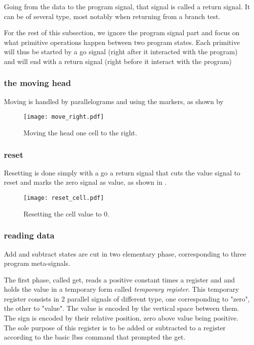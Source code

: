 Going from the data to the program signal, that signal is called a return signal.
It can be of several type, most notably when returning from a branch test.

For the rest of this subsection, we ignore the program signal part and focus on what primitive operations happen between two program states.
Each primitive will thus be started by a go signal (right after it interacted with the program) and will end with a return signal (right before it interact with the program)


\subsubsection{the moving head}
Moving is handled by parallelograms and using the markers, as shown by 

\begin{figure}[hbt]
	\centering
	\small%
	\texttt{[image: move\_right.pdf]}%
	\caption{Moving the head one cell to the right.}
	\label{fig:move:right}
\end{figure}


\subsubsection{reset}
Resetting is done simply with a go a return signal that cuts the value signal to reset and marks the zero signal as value, as shown in .
\begin{figure}[hbt]
	\centering
	\small%
	\texttt{[image: reset\_cell.pdf]}%
	\caption{Resetting the cell value to 0.}
	\label{fig:reset}
\end{figure}

\subsubsection{reading data}
Add and subtract states are cut in two elementary phase, corresponding to three program meta-signals.

The first phase, called get, reads a positive constant times a register and and holds the value in a temporary form called \emph{temporary register}. This temporary register consists in 2 parallel signals of different type, one corresponding to "zero", the other to "value". The value is encoded by the vertical space between them. The sign is encoded by their relative position, zero above value being positive. The sole purpose of this register is to be added or subtracted to a register according to the basic lbss command that prompted the get.

